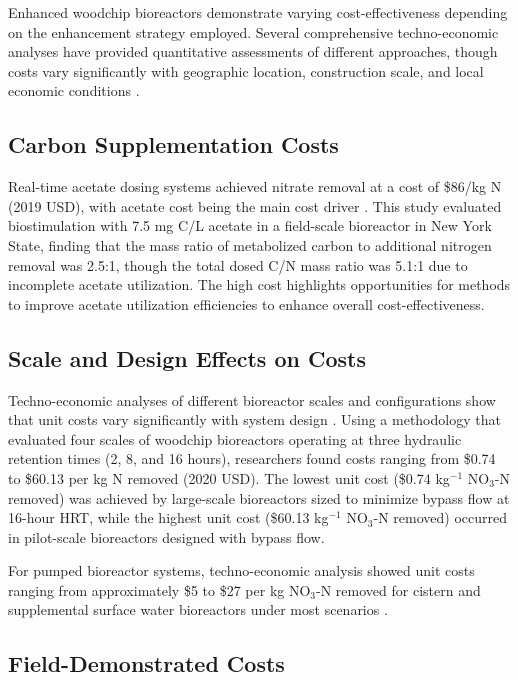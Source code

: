 \documentclass[12pt,a4paper]{article}
\begin{document}
Enhanced woodchip bioreactors demonstrate varying cost-effectiveness depending on the enhancement strategy employed. Several comprehensive techno-economic analyses have provided quantitative assessments of different approaches, though costs vary significantly with geographic location, construction scale, and local economic conditions \citep{RN348, RN605}.

\subsection{Carbon Supplementation Costs}

Real-time acetate dosing systems achieved nitrate removal at a cost of \$86/kg N (2019 USD), with acetate cost being the main cost driver \citep{RN196}. This study evaluated biostimulation with 7.5 mg C/L acetate in a field-scale bioreactor in New York State, finding that the mass ratio of metabolized carbon to additional nitrogen removal was 2.5:1, though the total dosed C/N mass ratio was 5.1:1 due to incomplete acetate utilization. The high cost highlights opportunities for methods to improve acetate utilization efficiencies to enhance overall cost-effectiveness.

\subsection{Scale and Design Effects on Costs}

Techno-economic analyses of different bioreactor scales and configurations show that unit costs vary significantly with system design \citep{RN348}. Using a methodology that evaluated four scales of woodchip bioreactors operating at three hydraulic retention times (2, 8, and 16 hours), researchers found costs ranging from \$0.74 to \$60.13 per kg N removed (2020 USD). The lowest unit cost (\$0.74 kg$^{-1}$ NO$_3$-N removed) was achieved by large-scale bioreactors sized to minimize bypass flow at 16-hour HRT, while the highest unit cost (\$60.13 kg$^{-1}$ NO$_3$-N removed) occurred in pilot-scale bioreactors designed with bypass flow.

For pumped bioreactor systems, techno-economic analysis showed unit costs ranging from approximately \$5 to \$27 per kg NO$_3$-N removed for cistern and supplemental surface water bioreactors under most scenarios \citep{RN605}.

\subsection{Field-Demonstrated Costs}
\end{document}
